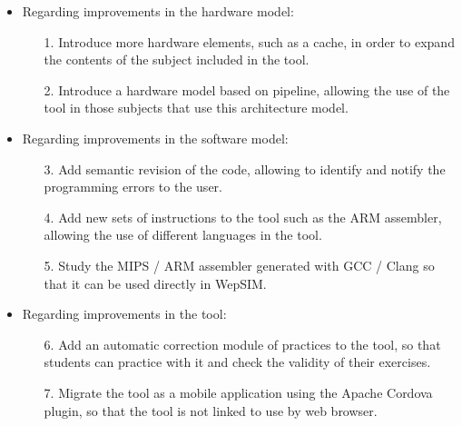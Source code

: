 \begin{itemize}

\item Regarding improvements in the hardware model:

\begin{itemize}

\item[1.] Introduce more hardware elements, such as a cache, in order to expand the contents of the subject included in the tool.

\item[2.] Introduce a hardware model based on pipeline, allowing the use of the tool in those subjects that use this architecture model.

\end{itemize}

\item Regarding improvements in the software model:

\begin{itemize}

\item[3.] Add semantic revision of the code, allowing to identify and notify the programming errors to the user.

\item[4.] Add new sets of instructions to the tool such as the ARM assembler, allowing the use of different languages in the tool.

\item[5.] Study the MIPS / ARM assembler generated with GCC / Clang so that it can be used directly in WepSIM.

\end{itemize}

\item Regarding improvements in the tool:

\begin{itemize}

\item[6.] Add an automatic correction module of practices to the tool, so that students can practice with it and check the validity of their exercises.

\item[7.] Migrate the tool as a mobile application using the Apache Cordova plugin, so that the tool is not linked to use by web browser.

\end{itemize}

\end{itemize}

